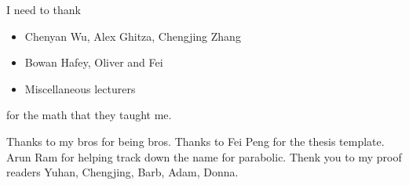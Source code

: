I need to thank
\begin{itemize}
	\item Chenyan Wu,  Alex Ghitza,  Chengjing Zhang	
	\item Bowan Hafey, Oliver and Fei
    \item Miscellaneous lecturers
\end{itemize}
for the math that they taught me. 

Thanks to my bros for being bros. Thanks to Fei Peng for the thesis template. Arun Ram for helping track down the name for parabolic. Thenk  you to my proof readers Yuhan, Chengjing, Barb, Adam, Donna.

